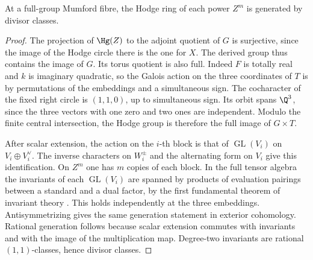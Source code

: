 \begin{proposition}\label{v7:prop:sixfold}
At a full-group Mumford fibre, the Hodge ring of each power \(Z^m\) is generated by divisor classes.
\end{proposition}
\begin{proof}
The projection of \(\Hg(Z)\) to the adjoint quotient of \(G\) is surjective, since the image of the Hodge circle there is the one for \(X\). The derived group thus contains the image of \(G\). Its torus quotient is also full. Indeed \(F\) is totally real and \(k\) is imaginary quadratic, so the Galois action on the three coordinates of \(T\) is by permutations of the embeddings and a simultaneous sign. The cocharacter of the fixed right circle is \((1,1,0)\), up to simultaneous sign. Its orbit spans \(\Q^3\), since the three vectors with one zero and two ones are independent. Modulo the finite central intersection, the Hodge group is therefore the full image of \(G\times T\).

After scalar extension, the action on the \(i\)-th block is that of \(\operatorname{GL}(V_i)\) on \(V_i\oplus V_i^\vee\). The inverse characters on \(W_i^\pm\) and the alternating form on \(V_i\) give this identification. On \(Z^m\) one has \(m\) copies of each block. In the full tensor algebra the invariants of each \(\operatorname{GL}(V_i)\) are spanned by products of evaluation pairings between a standard and a dual factor, by the first fundamental theorem of invariant theory \cite{Weyl39}. This holds independently at the three embeddings. Antisymmetrizing gives the same generation statement in exterior cohomology. Rational generation follows because scalar extension commutes with invariants and with the image of the multiplication map. Degree-two invariants are rational \((1,1)\)-classes, hence divisor classes.
\end{proof}
